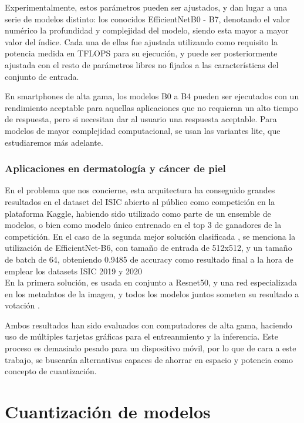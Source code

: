 Experimentalmente, estos parámetros pueden ser ajustados, y dan lugar a una serie de modelos distinto: los conocidos EfficientNetB0 - B7, denotando el valor numérico la profundidad y complejidad del modelo, siendo esta mayor a mayor valor del índice.	 Cada una de ellas fue ajustada utilizando como requisito la potencia medida en TFLOPS para su ejecución, y puede ser posteriormente ajustada con el resto de parámetros libres no fijados a las características del conjunto de entrada.

En smartphones de alta gama, los modelos B0 a B4 pueden ser ejecutados con un rendimiento aceptable para aquellas aplicaciones que no requieran un alto tiempo de respuesta, pero si necesitan dar al usuario una respuesta aceptable. Para modelos de mayor complejidad computacional, se usan las variantes lite, que estudiaremos más adelante.


\subsubsection{Aplicaciones en dermatología y cáncer de piel}

En el problema que nos concierne, esta arquitectura ha conseguido grandes resultados en el dataset del ISIC abierto al público como competición en la plataforma Kaggle, habiendo sido utilizado como parte de un ensemble de modelos, o bien como modelo único entrenado en el top 3 de ganadores de la competición. En el caso de la segunda mejor solución clasificada \cite{2ndISIC}, se menciona la utilización de EfficientNet-B6, con tamaño de entrada de 512x512, y un tamaño de batch de 64, obteniendo 0.9485 de accuracy como resultado final a la hora de emplear los datasets ISIC 2019 y 2020\\ En la primera solución, es usada en conjunto a Resnet50, y una red especializada en los metadatos de la imagen, y todos los modelos juntos someten su resultado a votación \cite{1stISIC}.

Ambos resultados han sido evaluados con computadores de alta gama, haciendo uso de múltiples tarjetas gráficas para el entreanmiento y la inferencia. Este proceso es demasiado pesado para un dispositivo móvil, por lo que de cara a este trabajo, se buscarán alternativas capaces de ahorrar en espacio y potencia como concepto de cuantización.

 \section{Cuantización de modelos}

